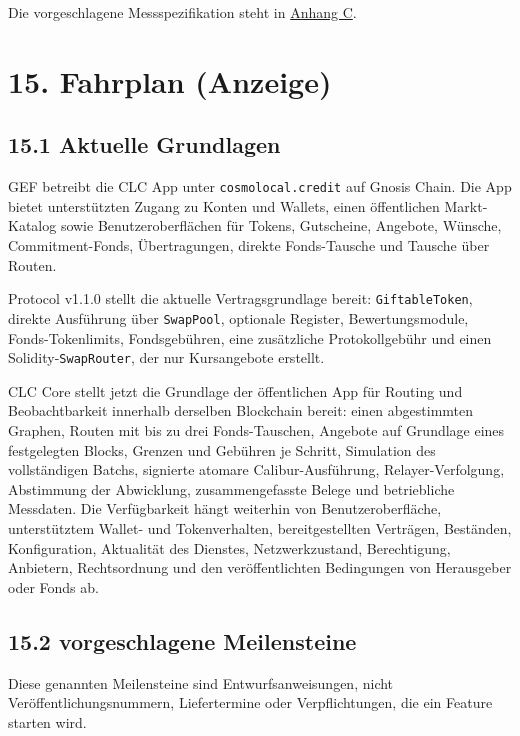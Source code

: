 \documentclass[11pt]{article}
\begin{document}
Die vorgeschlagene Messspezifikation steht in \href{https://docs.cosmolocal.credit/de/white-paper/appendix-c-kpi-definitions}{Anhang C}.


\section*{15. Fahrplan (Anzeige)}

\subsection*{15.1 Aktuelle Grundlagen}

GEF betreibt die CLC App unter \texttt{cosmolocal.credit} auf Gnosis Chain. Die App bietet unterstützten Zugang zu Konten und Wallets, einen öffentlichen Markt-Katalog sowie Benutzeroberflächen für Tokens, Gutscheine, Angebote, Wünsche, Commitment-Fonds, Übertragungen, direkte Fonds-Tausche und Tausche über Routen.

Protocol v1.1.0 stellt die aktuelle Vertragsgrundlage bereit: \texttt{GiftableToken}, direkte Ausführung über \texttt{SwapPool}, optionale Register, Bewertungsmodule, Fonds-Tokenlimits, Fondsgebühren, eine zusätzliche Protokollgebühr und einen Solidity-\texttt{SwapRouter}, der nur Kursangebote erstellt.

CLC Core stellt jetzt die Grundlage der öffentlichen App für Routing und Beobachtbarkeit innerhalb derselben Blockchain bereit: einen abgestimmten Graphen, Routen mit bis zu drei Fonds-Tauschen, Angebote auf Grundlage eines festgelegten Blocks, Grenzen und Gebühren je Schritt, Simulation des vollständigen Batchs, signierte atomare Calibur-Ausführung, Relayer-Verfolgung, Abstimmung der Abwicklung, zusammengefasste Belege und betriebliche Messdaten. Die Verfügbarkeit hängt weiterhin von Benutzeroberfläche, unterstütztem Wallet- und Tokenverhalten, bereitgestellten Verträgen, Beständen, Konfiguration, Aktualität des Dienstes, Netzwerkzustand, Berechtigung, Anbietern, Rechtsordnung und den veröffentlichten Bedingungen von Herausgeber oder Fonds ab.

\subsection*{15.2 vorgeschlagene Meilensteine}

Diese genannten Meilensteine sind Entwurfsanweisungen, nicht Veröffentlichungsnummern, Liefertermine oder Verpflichtungen, die ein Feature starten wird.
\end{document}
